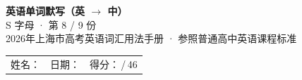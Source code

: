 \documentclass[10pt,a4paper]{article}
\begin{document}
\pagestyle{plain}

\begin{center}
{\LARGE\bfseries 英语单词默写（英 $\to$ 中）}\\[0.22em]
{\large S 字母 · 第 8 / 9 份}\\[0.18em]
{\small 2026年上海市高考英语词汇用法手册 · 参照普通高中英语课程标准}
\end{center}

\vspace{0.25em}
\noindent\begin{tabular}{@{}p{}@{}p{}@{}p{}@{}}
姓名：\underline{\hspace{2.0cm}} & 日期：\underline{\hspace{2.0cm}} & 得分：\underline{\hspace{1.3cm}}\,/\,46 \\
\end{tabular}

\vspace{0.3em}

\vspace{0.08em}
\end{document}
